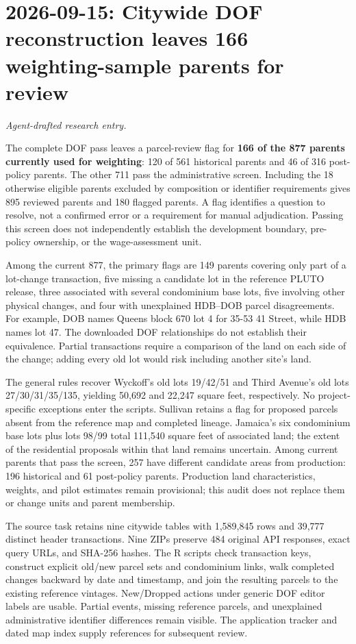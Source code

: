 \clearpage
\section*{2026-09-15: Citywide DOF reconstruction leaves 166 weighting-sample parents for review}
\textit{Agent-drafted research entry.}

The complete DOF pass leaves a parcel-review flag for \textbf{166 of the 877
parents currently used for weighting}: 120 of 561 historical parents and 46
of 316 post-policy parents. The other 711 pass the administrative screen.
Including the 18 otherwise eligible parents excluded by composition or
identifier requirements gives 895 reviewed parents and 180 flagged parents.
A flag identifies a question to resolve, not a confirmed error or a requirement
for manual adjudication. Passing this screen does not independently establish
the development boundary, pre-policy ownership, or the wage-assessment unit.

Among the current 877, the primary flags are 149 parents covering only part of
a lot-change transaction, five missing a candidate lot in the reference PLUTO
release, three associated with several condominium base lots, five involving
other physical changes, and four with unexplained HDB--DOB parcel disagreements.
For example, DOB names Queens block 670 lot 4 for 35-53 41 Street, while HDB
names lot 47. The downloaded DOF relationships do not establish their
equivalence. Partial transactions require a comparison of the land on each side
of the change; adding every old lot would risk including another site's land.

The general rules recover Wyckoff's old lots 19/42/51 and Third Avenue's old
lots 27/30/31/35/135, yielding 50,692 and 22,247 square feet, respectively.
No project-specific exceptions enter the scripts. Sullivan retains a flag for
proposed parcels absent from the reference map and completed lineage. Jamaica's
six condominium base lots plus lots 98/99 total 111,540 square feet of associated
land; the extent of the residential proposals within that land remains uncertain.
Among current parents that pass the screen, 257 have different candidate areas
from production: 196 historical and 61 post-policy parents. Production land
characteristics, weights, and pilot estimates remain provisional; this audit
does not replace them or change units and parent membership.

The source task retains nine citywide tables with 1,589,845 rows and 39,777
distinct header transactions. Nine ZIPs preserve 484 original API responses,
exact query URLs, and SHA-256 hashes. The R scripts check transaction keys,
construct explicit old/new parcel sets and condominium links, walk completed
changes backward by date and timestamp, and join the resulting parcels to the
existing reference vintages. New/Dropped actions under generic DOF editor
labels are usable. Partial events, missing reference parcels, and unexplained
administrative identifier differences remain visible. The application tracker
and dated map index supply references for subsequent review.

